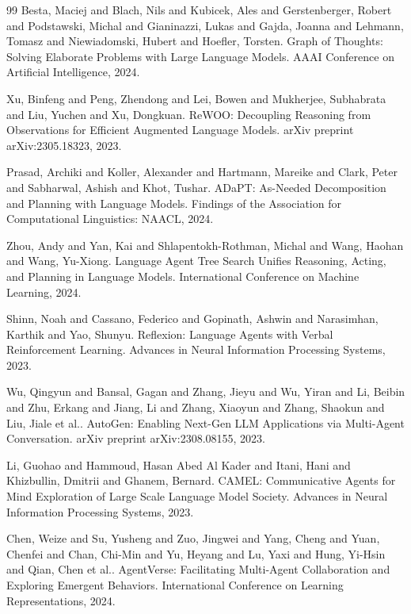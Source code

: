 \documentclass[11pt,a4paper]{article}
\begin{document}
\begin{thebibliography}{99}
Besta, Maciej and Blach, Nils and Kubicek, Ales and Gerstenberger, Robert and Podstawski, Michal and Gianinazzi, Lukas and Gajda, Joanna and Lehmann, Tomasz and Niewiadomski, Hubert and Hoefler, Torsten.
\newblock Graph of Thoughts: Solving Elaborate Problems with Large Language Models.
\newblock AAAI Conference on Artificial Intelligence, 2024.

Xu, Binfeng and Peng, Zhendong and Lei, Bowen and Mukherjee, Subhabrata and Liu, Yuchen and Xu, Dongkuan.
\newblock ReWOO: Decoupling Reasoning from Observations for Efficient Augmented Language Models.
\newblock arXiv preprint arXiv:2305.18323, 2023.

Prasad, Archiki and Koller, Alexander and Hartmann, Mareike and Clark, Peter and Sabharwal, Ashish and Khot, Tushar.
\newblock ADaPT: As-Needed Decomposition and Planning with Language Models.
\newblock Findings of the Association for Computational Linguistics: NAACL, 2024.

Zhou, Andy and Yan, Kai and Shlapentokh-Rothman, Michal and Wang, Haohan and Wang, Yu-Xiong.
\newblock Language Agent Tree Search Unifies Reasoning, Acting, and Planning in Language Models.
\newblock International Conference on Machine Learning, 2024.

Shinn, Noah and Cassano, Federico and Gopinath, Ashwin and Narasimhan, Karthik and Yao, Shunyu.
\newblock Reflexion: Language Agents with Verbal Reinforcement Learning.
\newblock Advances in Neural Information Processing Systems, 2023.

Wu, Qingyun and Bansal, Gagan and Zhang, Jieyu and Wu, Yiran and Li, Beibin and Zhu, Erkang and Jiang, Li and Zhang, Xiaoyun and Zhang, Shaokun and Liu, Jiale et al..
\newblock AutoGen: Enabling Next-Gen LLM Applications via Multi-Agent Conversation.
\newblock arXiv preprint arXiv:2308.08155, 2023.

Li, Guohao and Hammoud, Hasan Abed Al Kader and Itani, Hani and Khizbullin, Dmitrii and Ghanem, Bernard.
\newblock CAMEL: Communicative Agents for Mind Exploration of Large Scale Language Model Society.
\newblock Advances in Neural Information Processing Systems, 2023.

Chen, Weize and Su, Yusheng and Zuo, Jingwei and Yang, Cheng and Yuan, Chenfei and Chan, Chi-Min and Yu, Heyang and Lu, Yaxi and Hung, Yi-Hsin and Qian, Chen et al..
\newblock AgentVerse: Facilitating Multi-Agent Collaboration and Exploring Emergent Behaviors.
\newblock International Conference on Learning Representations, 2024.


\end{thebibliography}
\end{document}
